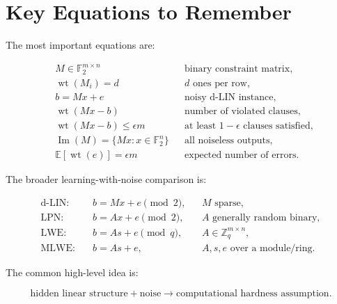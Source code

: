 \documentclass[11pt,a4paper]{article}
\newcommand{\F}{\mathbb{F}}
\newcommand{\wt}{\operatorname{wt}}
\newcommand{\Image}{\operatorname{Im}}
\newcommand{\E}{\mathbb{E}}
\newcommand{\Z}{\mathbb{Z}}
\begin{document}
\section{Key Equations to Remember}

The most important equations are:

\begin{align}
    &\boxed{M\in\F_2^{m\times n}}
    &&\text{binary constraint matrix},\\[4pt]
    &\boxed{\wt(M_i)=d}
    &&\text{$d$ ones per row},\\[4pt]
    &\boxed{b=Mx+e}
    &&\text{noisy d-LIN instance},\\[4pt]
    &\boxed{\wt(Mx-b)}
    &&\text{number of violated clauses},\\[4pt]
    &\boxed{\wt(Mx-b)\leq\epsilon m}
    &&\text{at least }1-\epsilon\text{ clauses satisfied},\\[4pt]
    &\boxed{\Image(M)=\{Mx:x\in\F_2^n\}}
    &&\text{all noiseless outputs},\\[4pt]
    &\boxed{\E[\wt(e)]=\epsilon m}
    &&\text{expected number of errors}.
\end{align}

The broader learning-with-noise comparison is:

\begin{align}
    \text{d-LIN:}\quad
    &b=Mx+e\pmod2,
    &&M\text{ sparse},\\
    \text{LPN:}\quad
    &b=Ax+e\pmod2,
    &&A\text{ generally random binary},\\
    \text{LWE:}\quad
    &b=As+e\pmod q,
    &&A\in\Z_q^{m\times n},\\
    \text{MLWE:}\quad
    &b=As+e,
    &&A,s,e\text{ over a module/ring}.
\end{align}

The common high-level idea is:

\[
\boxed{
\text{hidden linear structure}
+
\text{noise}
\longrightarrow
\text{computational hardness assumption}.
}
\]
\end{document}
